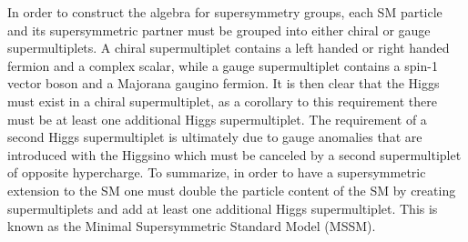 In order to construct the algebra for supersymmetry groups, each SM particle and its supersymmetric partner must be grouped into either chiral or gauge supermultiplets. 
A chiral supermultiplet contains a left handed or right handed fermion and a complex scalar, while a gauge supermultiplet contains a spin-1 vector boson and a Majorana gaugino fermion.
It is then clear that the Higgs must exist in a chiral supermultiplet, as a corollary to this requirement there must be at least one additional Higgs supermultiplet.
The requirement of a second Higgs supermultiplet is ultimately due to gauge anomalies that are introduced with the Higgsino which must be canceled by a second supermultiplet of opposite hypercharge.
To summarize, in order to have a supersymmetric extension to the SM one must double the particle content of the SM by creating supermultiplets and add at least one additional Higgs supermultiplet. 
This is known as the Minimal Supersymmetric Standard Model (MSSM).

